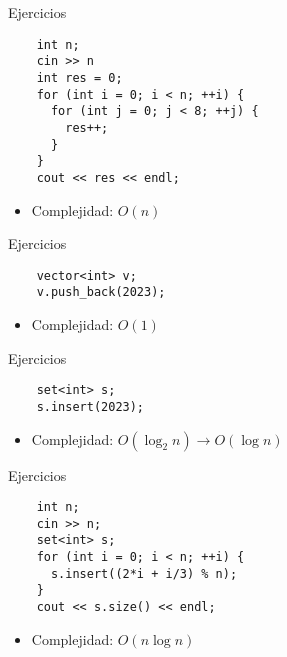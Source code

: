 \documentclass[10pt]{beamer}
\newcommand{\bi}{\begin{itemize}}
\newcommand{\ei}{\end{itemize}}
\begin{document}
\begin{frame}[fragile]{Ejercicios}
  \begin{verbatim}
    int n;
    cin >> n
    int res = 0;
    for (int i = 0; i < n; ++i) {
      for (int j = 0; j < 8; ++j) {
        res++;
      }
    }
    cout << res << endl;
  \end{verbatim}
  \bi
    \item Complejidad:  $O(n)$
  \ei
\end{frame}

\begin{frame}[fragile]{Ejercicios}
  \begin{verbatim}
    vector<int> v;
    v.push_back(2023);
  \end{verbatim}
  \bi
    \item Complejidad:  $O(1)$
  \ei
\end{frame}

\begin{frame}[fragile]{Ejercicios}
  \begin{verbatim}
    set<int> s;
    s.insert(2023);
  \end{verbatim}
  \bi
    \item Complejidad:  $O(\log_2 n) \rightarrow O(\log n)$
  \ei
\end{frame}

\begin{frame}[fragile]{Ejercicios}
  \begin{verbatim}
    int n;
    cin >> n;
    set<int> s;
    for (int i = 0; i < n; ++i) {
      s.insert((2*i + i/3) % n);
    }
    cout << s.size() << endl;
  \end{verbatim}
  \bi
    \item Complejidad:  $O(n \log n)$
  \ei
\end{frame}
\end{document}
